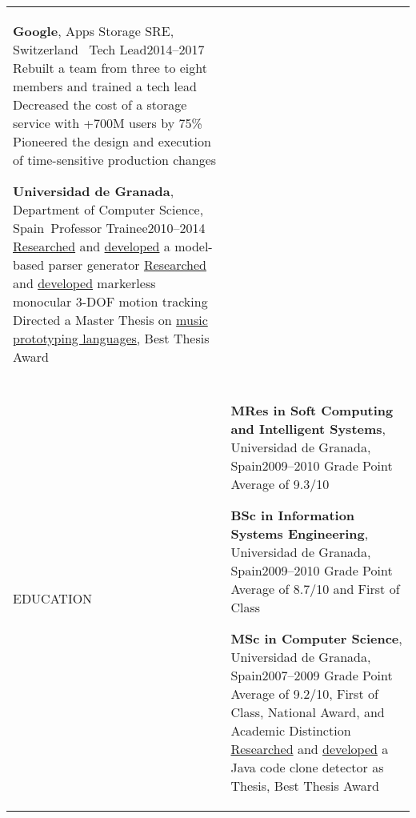 \documentclass[letterpaper,10pt,oneside]{article}
\newcommand{\DatestampY}[1]{#1}
\newenvironment{body}
{\par\par
\begin{longtable}{p{0.142\textwidth}p{0.807\textwidth}}}
{\par\end{longtable}\par}
\renewcommand{\section}[3]{\\[-0.9cm]\pdfbookmark[2]{#2}{#3}\\%
\raggedleft  %
{\fontsize{9.5pt}{9.5pt}\selectfont\bfseries\raggedright%
\MakeUppercase{#1}}&}
\newcommand{\SmallEntryGap}{\par\vspace{0.1em}\par}
\begin{document}
\begin{body}
\SmallEntryGap

\textbf{Google}, Apps Storage SRE, Switzerland \textemdash\ Tech Lead\hfill \DatestampY{2014}--\DatestampY{2017}\newline
\phantom{w}Rebuilt a team from three to eight members and trained a tech lead\newline
\phantom{w}Decreased the cost of a storage service with +700M users by 75\%\newline
\phantom{w}Pioneered the design and execution of time-sensitive production changes

\SmallEntryGap

\textbf{Universidad de Granada}, Department of Computer Science, Spain\textemdash\ Professor Trainee\hfill \DatestampY{2010}--\DatestampY{2014} \newline
\phantom{w}\href{https://doi.org/10.1142/S0218194014500375}{Researched} and \href{https://github.com/lquesada/ModelCC}{developed} a model-based parser generator \newline
\phantom{w}\href{https://doi.org/10.1142/S0129065712500190}{Researched} and \href{https://github.com/lquesada/MotionTracking}{developed} markerless monocular 3-DOF motion tracking \newline
\phantom{w}Directed a Master Thesis on \href{https://github.com/lquesada/ADAgio}{music prototyping languages}, Best Thesis Award


\section{Education}{Education}{PDF:Education}

\textbf{MRes in Soft Computing and Intelligent Systems}, Universidad de Granada, Spain\hfill \DatestampY{2009}--\DatestampY{2010} \newline
\phantom{w}Grade Point Average of 9.3/10

\SmallEntryGap

\textbf{BSc in Information Systems Engineering}, Universidad de Granada, Spain\hfill \DatestampY{2009}--\DatestampY{2010} \newline
\phantom{w}Grade Point Average of 8.7/10 and First of Class

\SmallEntryGap

\textbf{MSc in Computer Science}, Universidad de Granada, Spain\hfill \DatestampY{2007}--\DatestampY{2009} \newline
\phantom{w}Grade Point Average of 9.2/10, First of Class, National Award, and Academic Distinction \newline
\phantom{w}\href{https://doi.org/10.5220/0003013403330336}{Researched} and \href{https://github.com/lquesada/JSimil}{developed} a Java code clone detector as Thesis, Best Thesis Award


\end{body}
\end{document}
